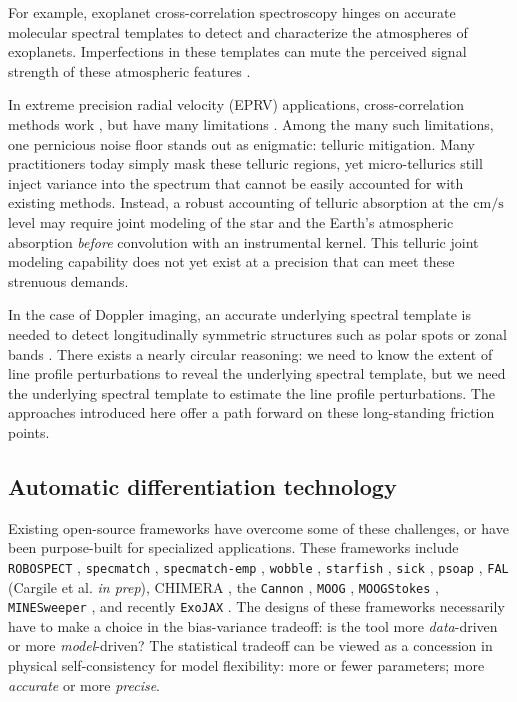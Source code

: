 \documentclass[twocolumn]{aastex631}
\begin{document}
For example, exoplanet cross-correlation spectroscopy \citep{2010Natur.465.1049S,2012Natur.486..502B,2013MNRAS.436L..35B} hinges on accurate molecular spectral templates to detect and characterize the atmospheres of exoplanets.  Imperfections in these templates can mute the perceived signal strength of these atmospheric features \citep{2015A&A...575A..20H}.

In extreme precision radial velocity (EPRV) applications, cross-correlation methods work \citep{2018A_A...620A..47D}, but have many limitations \citep{2022arXiv220110639Z}.  Among the many such limitations, one pernicious noise floor stands out as enigmatic: telluric mitigation.  Many practitioners today simply mask these telluric regions, yet micro-tellurics still inject variance into the spectrum that cannot be easily accounted for with existing methods.  Instead, a robust accounting of telluric absorption at the $\mathrm{cm/s}$ level may require joint modeling of the star and the Earth's atmospheric absorption \emph{before} convolution with an instrumental kernel.  This telluric joint modeling capability does not yet exist at a precision that can meet these strenuous demands.

In the case of Doppler imaging, an accurate underlying spectral template is needed to detect longitudinally symmetric structures \citep{1983PASP...95..565V,2021arXiv211006271L} such as polar spots \citep{roettenbacher16} or zonal bands \citep{Crossfield14,2021ApJ...906...64A}.  There exists a nearly circular reasoning: we need to know the extent of line profile perturbations to reveal the underlying spectral template, but we need the underlying spectral template to estimate the line profile perturbations.  The approaches introduced here offer a path forward on these long-standing friction points.

\subsection{Automatic differentiation technology}

Existing open-source frameworks have overcome some of these challenges, or have been purpose-built for specialized applications.
These frameworks include \texttt{ROBOSPECT} \citep{2013PASP..125.1164W}, \texttt{specmatch} \citep{2015PhDT........82P}, \texttt{specmatch-emp} \citep{2017ApJ...836...77Y}, \texttt{wobble} \citep{2019AJ....158..164B}, \texttt{starfish} \citep{czekala15}, \texttt{sick} \citep{2016ApJS..223....8C}, \texttt{psoap} \citep{2017ApJ...840...49C}, \texttt{FAL} (Cargile et al. \emph{in prep}), CHIMERA \citep{2015ApJ...807..183L}, the \texttt{Cannon} \citep{2017ApJ...836....5H},  \texttt{MOOG} \citep{2012ascl.soft02009S}, \texttt{MOOGStokes} \citep{2013AJ....146...51D}, \texttt{MINESweeper} \citep{2020ApJ...900...28C}, and recently \texttt{ExoJAX} \citep{2022ApJS..258...31K}.
The designs of these frameworks necessarily have to make a choice in the bias-variance tradeoff: is the tool more \emph{data}-driven or more \emph{model}-driven?  The statistical tradeoff can be viewed as a concession in physical self-consistency for model flexibility: more or fewer parameters; more \emph{accurate} or more \emph{precise}.
\end{document}

